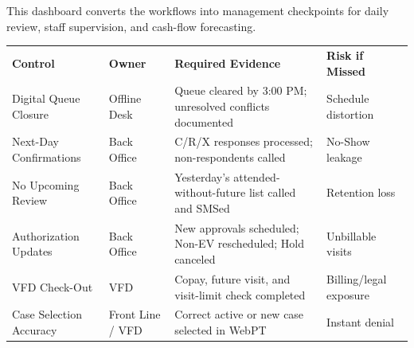\documentclass[11pt,a4paper]{article}
\begin{document}
This dashboard converts the workflows into management checkpoints for daily review,
staff supervision, and cash-flow forecasting.

\begin{tcolorbox}[infobox,title={Daily Control Points}]
\begin{tabularx}{\linewidth}{L{3.4cm} L{3.2cm} X L{3.1cm}}
  \color{white}\textbf{Control} & \color{white}\textbf{Owner} & \color{white}\textbf{Required Evidence} & \color{white}\textbf{Risk if Missed} \\
  Digital Queue Closure & Offline Desk & Queue cleared by 3:00 PM; unresolved conflicts documented & Schedule distortion \\
  Next-Day Confirmations & Back Office & C/R/X responses processed; non-respondents called & No-Show leakage \\
  No Upcoming Review & Back Office & Yesterday's attended-without-future list called and SMSed & Retention loss \\
  Authorization Updates & Back Office & New approvals scheduled; Non-EV rescheduled; Hold canceled & Unbillable visits \\
  VFD Check-Out & VFD & Copay, future visit, and visit-limit check completed & Billing/legal exposure \\
  Case Selection Accuracy & Front Line / VFD & Correct active or new case selected in WebPT & Instant denial \\
\end{tabularx}
\end{tcolorbox}

\begin{center}
\end{center}
\end{document}
